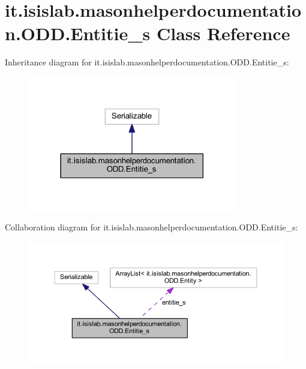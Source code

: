 \hypertarget{classit_1_1isislab_1_1masonhelperdocumentation_1_1_o_d_d_1_1_entitie__s}{\section{it.\-isislab.\-masonhelperdocumentation.\-O\-D\-D.\-Entitie\-\_\-s Class Reference}
\label{classit_1_1isislab_1_1masonhelperdocumentation_1_1_o_d_d_1_1_entitie__s}
}


Inheritance diagram for it.\-isislab.\-masonhelperdocumentation.\-O\-D\-D.\-Entitie\-\_\-s\-:\nopagebreak
\begin{figure}[H]
\begin{center}
\leavevmode
\includegraphics[width=258pt]{classit_1_1isislab_1_1masonhelperdocumentation_1_1_o_d_d_1_1_entitie__s__inherit__graph}
\end{center}
\end{figure}


Collaboration diagram for it.\-isislab.\-masonhelperdocumentation.\-O\-D\-D.\-Entitie\-\_\-s\-:\nopagebreak
\begin{figure}[H]
\begin{center}
\leavevmode
\includegraphics[width=350pt]{classit_1_1isislab_1_1masonhelperdocumentation_1_1_o_d_d_1_1_entitie__s__coll__graph}
\end{center}
\end{figure}
